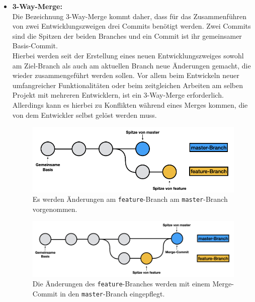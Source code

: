 \begin{itemize}
	\item \textbf{3-Way-Merge:}\\
		Die Bezeichnung 3-Way-Merge kommt daher, dass für das Zusammenführen von zwei Entwicklungszweigen 
		drei Commits benötigt werden. Zwei Commits sind die Spitzen der beiden Branches und ein Commit ist ihr
		gemeinsamer Basis-Commit.\\
		Hierbei werden seit der Erstellung eines neuen Entwicklungszweiges sowohl 
		am Ziel-Branch als auch am aktuellen Branch neue Änderungen gemacht, die wieder zusammengeführt
		werden sollen. Vor allem beim Entwickeln neuer umfangreicher Funktionalitäten oder beim zeitgleichen 
		Arbeiten am selben Projekt mit mehreren Entwicklern, ist ein 3-Way-Merge erforderlich. \\
		Allerdings kann es hierbei zu Konflikten während eines Merges kommen, die von dem Entwickler selbst
		gelöst werden muss.
		
		\begin{figure}[H]
		\begin{center}
			\includegraphics[scale=.8]{images/git-3-way-merge-before.png}
		\end{center}
			\caption{Es werden Änderungen am \texttt{feature}-Branch am \texttt{master}-Branch vorgenommen.}
		\end{figure}
		
		\begin{figure}[H]
		\begin{center}
			\includegraphics[scale=.8]{images/git-3-way-merge-after.png}
		\end{center}
			\caption{Die Änderungen des \texttt{feature}-Branches werden mit einem Merge-Commit in den 
				\texttt{master}-Branch eingepflegt.}
		\end{figure}
\end{itemize}

